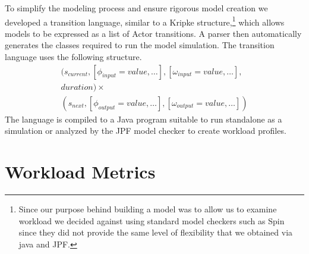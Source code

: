 

To simplify the modeling process and ensure rigorous model creation we
developed a transition language, similar to a Kripke structure,\footnote{Since our purpose behind building a model was to allow us to examine workload we decided against using standard model checkers such as Spin since they did not provide the same level of flexibility that we obtained via java and JPF.}  which allows
models to be expressed as a list of Actor transitions.  A parser then
automatically generates the classes required to run the model simulation.
The transition language uses the following structure.
\begin{equation}
\begin{split}
(s_{current}, [\phi_{input} = value,\ldots], [\omega_{input} = value,\ldots],\\
duration) \times \\
(s_{next}, [\phi_{output} =
value,\ldots], [\omega_{output} = value,\ldots])
\end{split}
\end{equation}
\noindent The language is compiled to a Java program suitable to run standalone
as a simulation or analyzed by the JPF model checker to create
workload profiles.

\section{Workload Metrics}

